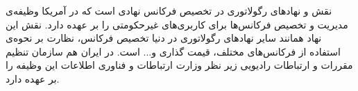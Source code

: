 \Question
{نقش 
و نهادهای رگولاتوری در تخصیص فرکانس}
{
	 نهادی است که در آمریکا وظیفه‌ی مدیریت و تخصیص فرکانس‌ها برای کاربری‌های غیرحکومتی را بر عهده دارد. نقش این نهاد همانند سایر نهادهای رگولاتوری در دنیا تخصیص فرکانس، نظارت بر نحوه‌ی استفاده از فرکانس‌های مختلف،  قیمت گذاری و... است. در ایران هم سازمان تنظیم مقررات و ارتباطات رادیویی زیر نظر وزارت ارتباطات و فناوری اطلاعات این وظیفه را بر عهده دارد.
}
